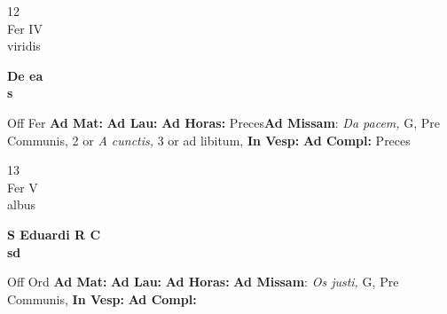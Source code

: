 \documentclass[10pt, openany]{book}
\begin{document}
        \begin{center}
            \begin{minipage}{3.5in}
                \vspace{2em}
                \begin{minipage}{0.5in}
                    {\Huge 12} \\
                    {\normalsize Fer IV} \\
                    {\normalsize viridis}
                \end{minipage}
                \begin{minipage}{3.0in}
                    \textbf{ \large De ea \\
                    \textnormal{\normalsize s}} \\ 
                \end{minipage}
                \begin{justify}Off Fer
                    \textbf{Ad Mat: }
                    \textbf{Ad Lau: }
                    \textbf{Ad Horas: }Preces\textbf{Ad Missam}: \textit{Da pacem,} G, Pre Communis, 2 or \textit{A cunctis,} 3 or ad libitum,  
                    \textbf{In Vesp: }
                    \textbf{Ad Compl: }Preces
                \end{justify}
            \end{minipage}
        \end{center}
    
        \begin{center}
            \begin{minipage}{3.5in}
                \vspace{2em}
                \begin{minipage}{0.5in}
                    {\Huge 13} \\
                    {\normalsize Fer V} \\
                    {\normalsize albus}
                \end{minipage}
                \begin{minipage}{3.0in}
                    \textbf{ \large S Eduardi R C \\
                    \textnormal{\normalsize sd}} \\ 
                \end{minipage}
                \begin{justify}Off Ord
                    \textbf{Ad Mat: }
                    \textbf{Ad Lau: }
                    \textbf{Ad Horas: }\textbf{Ad Missam}: \textit{Os justi,} G, Pre Communis,  
                    \textbf{In Vesp: }
                    \textbf{Ad Compl: }
                \end{justify}
            \end{minipage}
        \end{center}
    
\end{document}

